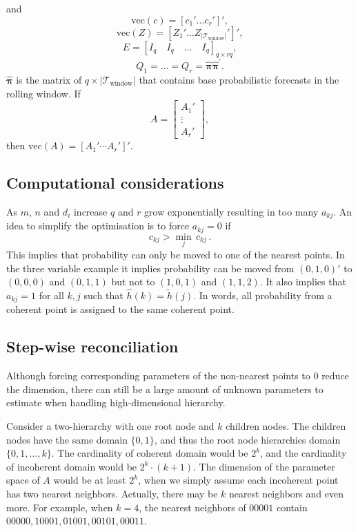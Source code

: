 \documentclass{article}
\begin{document}
    and
    \[\textrm{vec}(c) = \left[c_1' \dots c_r'\right]',\]
    \[\textrm{vec}(Z) = \left[Z_1' \dots Z_{|\mathcal{T}_{\textrm{window}}|}'\right]',\]
    \[E = [I_q \quad I_q  \quad \dots \quad I_q]_{q\times rq},\]
    \[Q_1 =\dots =Q_r = \hat{\boldsymbol{\pi}}\hat{\boldsymbol{\pi}}^\prime.\] $\hat{\boldsymbol{\pi}}$ is the matrix of $q \times |\mathcal{T}_{\textrm{window}}|$ that contains base probabilistic forecasts in the rolling window. If \[A = \left[\begin{matrix}
      A_1' \\ \vdots \\ A_r'
    \end{matrix}\right],\] then $\textrm{vec}(A) = [A_1' \cdots A_r']'$.    

    
    \subsection{Computational considerations}
    
    As $m$, $n$ and $d_i$ increase $q$ and $r$ grow exponentially resulting in too many $a_{kj}$. An idea to simplify the optimisation is to force $a_{kj}=0$ if 
    \[
     c_{kj}>\underset{j}{\min}\,c_{kj}\,.
    \]  
    This implies that probability can only be moved to one of the nearest points. In the three variable example it implies probability can be moved from $(0,1,0)'$ to $(0,0,0)$ and $(0,1,1)$ but not to $(1,0,1)$ and $(1,1,2)$. It also implies that $a_{kj}=1$ for all $k,j$ such that $\hat{h}(k)=\tilde{h}(j)$. In words, all probability from a coherent point is assigned to the same coherent point.

   \subsection{Step-wise reconciliation}

   Although forcing corresponding parameters of the non-nearest points to 0 reduce the dimension, there can still be a large amount of unknown parameters to estimate when handling high-dimensional hierarchy. 
   
   Consider a two-hierarchy with one root node and $k$ children nodes. 
   The children nodes have the same domain $\{0, 1\}$, and thus the root node hierarchies domain $\{0, 1, \dots, k\}$.
   The cardinality of coherent domain would be $2^k$, and the cardinality of incoherent domain would be $2^k\cdot (k+1)$. 
   The dimension of the parameter space of $A$ would be at least $2^k$, when we simply assume each incoherent point has two nearest neighbors. Actually, there may be $k$ nearest neighbors and even more. For example, when $k=4$, the nearest neighbors of $00001$ contain $00000, 10001, 01001, 00101, 00011$.
\end{document}
